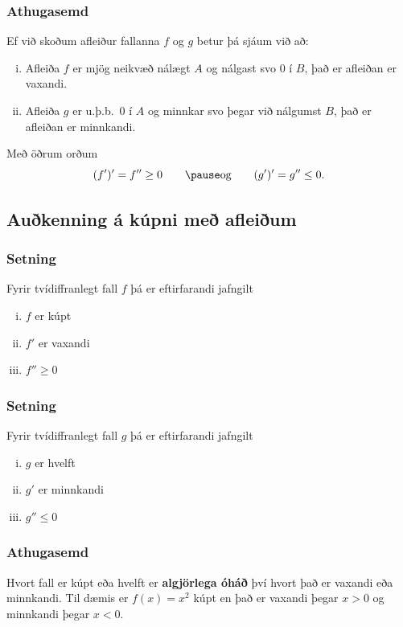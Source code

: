 \documentclass[icelandic,a4paper,12pt]{article}
\begin{document}
\subsubsection{Athugasemd} 
Ef við skoðum afleiður fallanna $f$ og $g$ betur þá sjáum við að:
\pause
\begin{enumerate}[(i)]
\item Afleiða $f$ er mjög neikvæð nálægt $A$ og nálgast svo 0 í $B$, það er afleiðan er vaxandi.
\item Afleiða $g$ er u.þ.b.~0 í $A$ og minnkar svo þegar við nálgumst $B$, það er afleiðan er minnkandi.
\end{enumerate}
\pause
Með öðrum orðum
\pause
\begin{equation*}
	(f')' = f'' \geq 0 \qquad  \pause \text{og} \qquad
	(g')' = g'' \leq 0.
\end{equation*}

\subsection{Auðkenning á kúpni með afleiðum}
\subsubsection{Setning}
Fyrir tvídiffranlegt fall $f$ þá er eftirfarandi jafngilt
\pause
\begin{enumerate}[(i)]
\item $f$ er kúpt\pause
\item $f'$ er vaxandi\pause
\item $f'' \geq 0$
\end{enumerate}

\subsubsection{Setning}
Fyrir tvídiffranlegt fall $g$ þá er eftirfarandi jafngilt
\pause
\begin{enumerate}[(i)]
\item $g$ er hvelft\pause
\item $g'$ er minnkandi\pause
\item $g'' \leq 0$
\end{enumerate}

\subsubsection{Athugasemd}
Hvort fall er kúpt eða hvelft er {\bf algjörlega óháð} því 
hvort það er vaxandi eða minnkandi. Til dæmis er $f(x) = x^2$ kúpt en það 
er vaxandi þegar $x>0$ og minnkandi þegar $x<0$.
\end{document}

